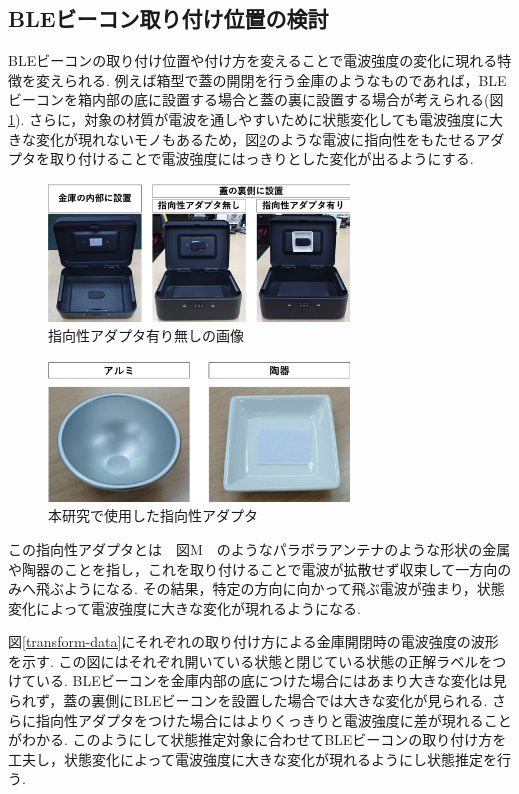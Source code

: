 \documentclass[Japanese]{dicomopapers}
\begin{document}
\subsection{BLEビーコン取り付け位置の検討}
BLEビーコンの取り付け位置や付け方を変えることで電波強度の変化に現れる特徴を変えられる.
例えば箱型で蓋の開閉を行う金庫のようなものであれば，BLEビーコンを箱内部の底に設置する場合と蓋の裏に設置する場合が考えられる(図\ref{adapter}).
さらに，対象の材質が電波を通しやすいために状態変化しても電波強度に大きな変化が現れないモノもあるため，図\ref{adapter_only}のような電波に指向性をもたせるアダプタを取り付けることで電波強度にはっきりとした変化が出るようにする.
\begin{figure}[b]
    \centering
    \includegraphics[width=8cm]{adapta_compare2.png}
    \caption{指向性アダプタ有り無しの画像}
    \label{adapter}
\end{figure}
\begin{figure}[b]
    \centering
    \includegraphics[width=8cm]{adapta.png}
    \caption{本研究で使用した指向性アダプタ}
    \label{adapter_only}
\end{figure}
この指向性アダプタとは　図M　のようなパラボラアンテナのような形状の金属や陶器のことを指し，これを取り付けることで電波が拡散せず収束して一方向のみへ飛ぶようになる.
その結果，特定の方向に向かって飛ぶ電波が強まり，状態変化によって電波強度に大きな変化が現れるようになる.

図\ref{transform-data}にそれぞれの取り付け方による金庫開閉時の電波強度の波形を示す.
この図にはそれぞれ開いている状態と閉じている状態の正解ラベルをつけている.
BLEビーコンを金庫内部の底につけた場合にはあまり大きな変化は見られず，蓋の裏側にBLEビーコンを設置した場合では大きな変化が見られる.
さらに指向性アダプタをつけた場合にはよりくっきりと電波強度に差が現れることがわかる.
このようにして状態推定対象に合わせてBLEビーコンの取り付け方を工夫し，状態変化によって電波強度に大きな変化が現れるようにし状態推定を行う.
\end{document}
